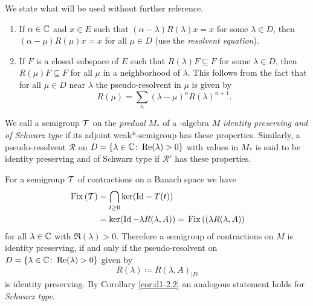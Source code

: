 We state what will be used without further reference.
\begin{enumerate}[\upshape (i), wide, itemindent=.5em]
\item 
If $ \alpha \in \mathbb{C} $ and $ x \in E $ such that $ (\alpha - \lambda)R(\lambda)x = x $ for some $ \lambda \in D $, then $ (\alpha - \mu)R(\mu)x = x $ for all $ \mu \in D $ (use the \emph{resolvent equation}).

\item 
If $ F $ is a closed subspace of $ E $ such that $ R(\lambda)F \subseteq F $ for some $ \lambda \in D $, then $ R(\mu)F \subseteq F $ for all $ \mu $ in a neighborhood of $ \lambda $.
This follows from the fact that for all $ \mu \in D $ near $ \lambda $ the pseudo-resolvent in $ \mu $ is given by
\[
R(\mu) = \sum_{n} (\lambda - \mu)^{n} R(\lambda)^{n+1}.
\]
\end{enumerate}
\begin{definition}\label{def:d1-2.5}
We call a semigroup $ \mathcal{T} $ on the \emph{predual} $ M_{*} $ of a \WA-algebra $ M $ \emph{identity preserving and of Schwarz type} if its adjoint weak*-semigroup has these properties.
Similarly, a pseudo-resolvent $ \mathcal{R} $ on $ D = \{\lambda \in \mathbb{C} \colon \mathop{}\!\mathrm{Re}(\lambda) > 0\} $ with values in $ M_{*} $ is said to be identity preserving and of Schwarz type if $ \mathcal{R}' $ has these properties.
\end{definition}
For a semigroup $ \mathcal{T} $ of contractions on a Banach space we have
\begin{align*}
	\mathop{}\mathrm{Fix}\left(\mathcal{T}\right) &= \bigcap_{t \geq 0} \ker(\text{Id} - T(t)) \\ 
			& = \ker(\operatorname{Id} - \lambda R(\lambda,A)) = \mathop{}\mathrm{Fix}\left( (\lambda R(\lambda,A) \right)
\end{align*}
for all $ \lambda \in \mathbb{C} $ with $ \Re(\lambda) > 0 $.
Therefore a semigroup of contractions on $ M $ is identity preserving, if and only if the pseudo-resolvent on 
$ D = \{\lambda \in \mathbb{C} \colon \mathop{}\!\mathrm{Re}(\lambda) > 0\} $ given by
\[
	R(\lambda) \coloneqq R(\lambda,A)_{\vert D}
\]
is identity preserving.
By Corollary \ref{cor:d1-2.2} an analogous statement holds for \emph{Schwarz type}.
